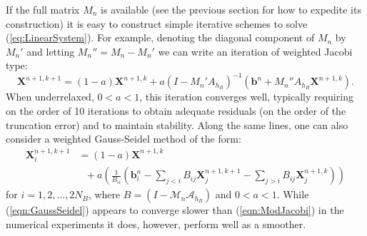 \documentclass[preprint,12pt]{elsarticle}
\begin{document}
If the full matrix  $\mathit{M}_n$ is available (see the previous section for how to expedite its construction) it is easy to construct
simple iterative schemes to solve (\ref{eq:LinearSystem}). For example, denoting the diagonal component of $\mathit{M}_n$ by $\mathit{M}_n'$   and letting $\mathit{M}_n'' = \mathit{M}_n - \mathit{M}_n'$ we can write an iteration of weighted Jacobi type:
\begin{equation}
\mathbf{X}^{n+1,k+1} = (1-a)\mathbf{X}^{n+1,k} 
+ a(\mathit{I}- \mathit{M}_n'\mathit{A}_{h_B})^{-1}
(\mathbf{b}^n +\mathit{M}_n''\mathit{A}_{h_B}\mathbf{X}^{n+1,k}).
\label{eqn:ModJacobi}
\end{equation}
When underrelaxed, $0<a<1$, this iteration converges well, typically requiring on the order of 10 iterations to obtain
adequate residuals (on the order of the truncation error) and to maintain stability. Along the same lines, one can also consider a weighted Gauss-Seidel method of the form:
\begin{equation}
\begin{split}
\mathbf{X}^{n+1,k+1}_i
&=
(1-a)\mathbf{X}^{n+1,k} \\
&\mbox{ } +  a\left(
\frac{1}{B_{ii}} \left(\mathbf{b}^n_i - \sum_{j<i}B_{ij}\mathbf{X}^{n+1,k+1}_j-\sum_{j>i}B_{ij}\mathbf{X}^{n+1,k}_j\right)
\right)
\end{split}
\label{eqn:GaussSeidel}
\end{equation}
for $ i=1,2,\ldots,2N_B$, 
where $B=(\mathit{I}- \mathcal{M}_n\mathcal{A}_{h_B})$  and  $0<a<1$. 
While (\ref{eqn:GaussSeidel}) appears to converge slower than (\ref{eqn:ModJacobi}) in the numerical experiments
it does, however, perform well as a smoother.
\end{document}
